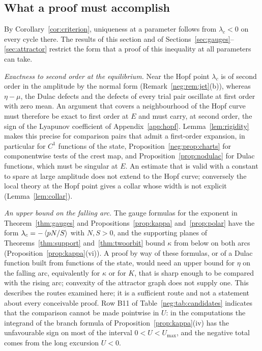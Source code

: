 \subsection{What a proof must accomplish}\label{neg:sec:requirements}
By Corollary~\ref{cor:criterion}, uniqueness at a parameter follows from $\lambda_c<0$ on every cycle there. The results of this section and of Sections~\ref{sec:gauges}--\ref{sec:attractor} restrict the form that a proof of this inequality at all parameters can take.

\emph{Exactness to second order at the equilibrium.} Near the Hopf point $\lambda_c$ is of second order in the amplitude by the normal form (Remark~\ref{neg:rem:jet}(b)), whereas $\eta-\mu$, the Dulac defects and the defects of every trial pair oscillate at first order with zero mean. An argument that covers a neighbourhood of the Hopf curve must therefore be exact to first order at $E$ and must carry, at second order, the sign of the Lyapunov coefficient of Appendix~\ref{app:hopf}. Lemma~\ref{lem:rigidity} makes this precise for comparison pairs that admit a first-order expansion, in particular for $C^1$ functions of the state, Proposition~\ref{neg:prop:charts} for componentwise tests of the crest map, and Proposition~\ref{prop:nodulac} for Dulac functions, which must be singular at $E$. An estimate that is valid with a constant to spare at large amplitude does not extend to the Hopf curve; conversely the local theory at the Hopf point gives a collar whose width is not explicit (Lemma~\ref{lem:collar}).

\emph{An upper bound on the falling arc.} The gauge formulas for the exponent in Theorem~\ref{thm:gauges} and Propositions~\ref{prop:kappa} and~\ref{prop:polar} have the form $\lambda_c=-\left\langle pN/S\right\rangle$ with $N,S>0$, and the supporting planes of Theorems~\ref{thm:support} and~\ref{thm:twoorbit} bound $\kappa$ from below on both arcs (Proposition~\ref{prop:kappa}(vi)). A proof by way of these formulas, or of a Dulac function built from functions of the state, would need an upper bound for $\eta$ on the falling arc, equivalently for $\kappa$ or for $K$, that is sharp enough to be compared with the rising arc; convexity of the attractor graph does not supply one. This describes the routes examined here; it is a sufficient route and not a statement about every conceivable proof. Row B11 of Table~\ref{neg:tab:candidates} indicates that the comparison cannot be made pointwise in $U$: in the computations the integrand of the branch formula of Proposition~\ref{prop:kappa}(iv) has the unfavourable sign on most of the interval $0<U<U_{\max}$, and the negative total comes from the long excursion $U<0$.

